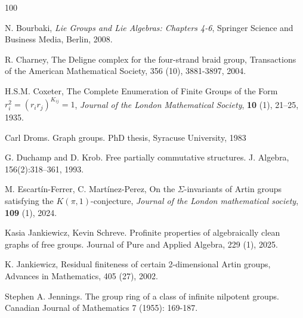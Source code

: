 \documentclass[10pt, oneside]{amsart}
\theoremstyle{definition}
\theoremstyle{remark}
\theoremstyle{plain}
\begin{document}
\begin{thebibliography}{100}

	N. Bourbaki, \textit{Lie Groups and Lie Algebras: Chapters 4-6}, Springer Science and Business Media, Berlin, 2008.

 R. Charney, The Deligne complex for the four-strand braid group, Transactions of the
American Mathematical Society, 356 (10), 3881-3897, 2004.

H.S.M. Coxeter, The Complete Enumeration of Finite Groups of the Form $r^2_i=(r_ir_j)^{K_{ij}}=1$, \textit{Journal of the London Mathematical Society}, \textbf{10} (1), 21–25, 1935.
    


 Carl Droms. Graph groups. PhD thesis, Syracuse University, 1983


 G. Duchamp and D. Krob. Free partially commutative structures. J. Algebra, 156(2):318–361,
1993.

 M. Escartín-Ferrer, C. Martínez-Perez, On the $\Sigma$-invariants of Artin groups satisfying the $K(\pi,1)$-conjecture, \textit{Journal of the London mathematical society}, \textbf{109} (1), 2024.

 Kasia Jankiewicz, Kevin Schreve. Profinite properties of algebraically clean graphs of free groups. Journal of Pure and Applied Algebra, 229 (1), 2025.

 K. Jankiewicz, Residual finiteness of certain 2-dimensional Artin groups, Advances in Mathematics, 405 (27), 2002.

 Stephen A. Jennings. The group ring of a class of infinite nilpotent groups. Canadian Journal of Mathematics 7 (1955): 169-187. %


\end{thebibliography}
\end{document}
